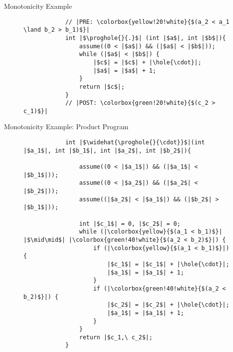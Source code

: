 \begin{frame}[fragile]{Monotonicity Example}
    \begin{figure}[t]
        \begin{verbatim}
            // |PRE: \colorbox{yellow!20!white}{$(a_2 < a_1 \land b_2 > b_1)$}|
            int |$\proghole{}{.}$| (int |$a$|, int |$b$|){
                assume((0 < |$a$|) && (|$a$| < |$b$|));
                while (|$a$| < |$b$|) {
                    |$c$| = |$c$| + |\hole{\cdot}|;
                    |$a$| = |$a$| + 1;
                }
                return |$c$|;
            }
            // |POST: \colorbox{green!20!white}{$(c_2 > c_1)$}|
        \end{verbatim}
        \label{list:prog:qbsynth}
    \end{figure}
\end{frame}

\begin{frame}[fragile]{Monotonicity Example: Product Program}
    \centering
    \begin{figure}[t]
        \begin{verbatim}
            int |$\widehat{\proghole{}{\cdot}}$|(int |$a_1$|, int |$b_1$|, int |$a_2$|, int |$b_2$|){

                assume((0 < |$a_1$|) && (|$a_1$| < |$b_1$|));
                assume((0 < |$a_2$|) && (|$a_2$| < |$b_2$|));
                assume((|$a_2$| < |$a_1$|) && (|$b_2$| > |$b_1$|));

                int |$c_1$| = 0, |$c_2$| = 0;
                while (|\colorbox{yellow}{$(a_1 < b_1)$}| |$\mid\mid$| |\colorbox{green!40!white}{$(a_2 < b_2)$}|) {
                    if (|\colorbox{yellow}{$(a_1 < b_1)$}|) {
                        |$c_1$| = |$c_1$| + |\hole{\cdot}|;
                        |$a_1$| = |$a_1$| + 1;
                    }
                    if (|\colorbox{green!40!white}{$(a_2 < b_2)$}|) {
                        |$c_2$| = |$c_2$| + |\hole{\cdot}|;
                        |$a_1$| = |$a_1$| + 1;
                    }
                }
                return |$c_1,\ c_2$|;
            }
        \end{verbatim}
    \end{figure}
\end{frame}